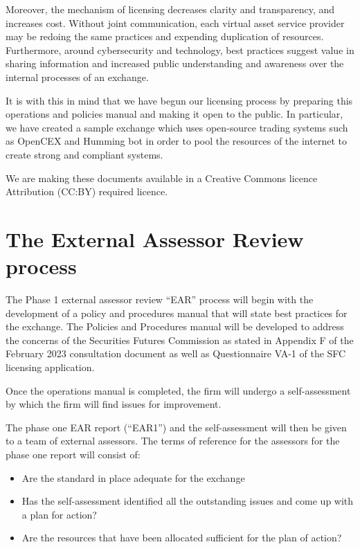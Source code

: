 Moreover, the mechanism of licensing decreases clarity and
transparency, and increases cost.  Without joint communication, each
virtual asset service provider may be redoing the same practices and
expending duplication of resources.  Furthermore, around
cybersecurity and technology, best practices suggest value in sharing
information and increased public understanding and awareness over the
internal processes of an exchange.

It is with this in mind that we have begun our licensing process by
preparing this operations and policies manual and making it open to
the public.  In particular, we have created a sample exchange which
uses open-source trading systems such as OpenCEX and Humming bot in
order to pool the resources of the internet to create strong and
compliant systems.

We are making these documents available in a Creative Commons licence
Attribution (CC:BY) required licence.

\section{The External Assessor Review process}

The Phase 1 external assessor review ``EAR'' process will begin with
the development of a policy and procedures manual that will state best
practices for the exchange.  The Policies and Procedures manual will
be developed to address the concerns of the Securities Futures
Commission as stated in Appendix F of the February 2023 consultation
document as well as Questionnaire VA-1 of the SFC licensing
application.

Once the operations manual is completed, the firm will undergo a
self-assessment by which the firm will find issues for improvement.

The phase one EAR report (``EAR1'') and the self-assessment will then
be given to a team of external assessors.  The terms of reference for
the assessors for the phase one report will consist of:

\begin{itemize}
\item Are the standard in place adequate for the exchange
  \item Has the self-assessment identified all the outstanding
    issues and come up with a plan for action?
  \item Are the resources that have been allocated sufficient for the
    plan of action?
\end{itemize}

